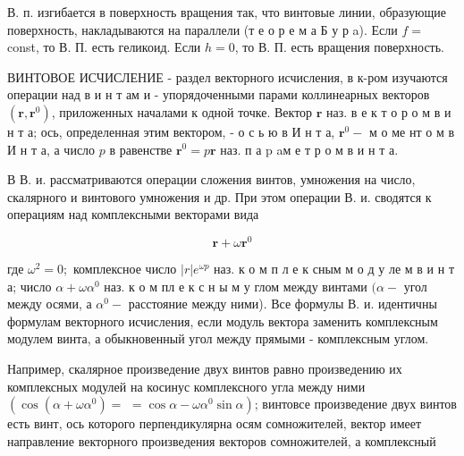 \documentclass[10pt]{article}
\begin{document}
В. п. изгибается в поверхность вращения так, что винтовые линии, образующие поверхность, накладываются на параллели (т е о р е м а Б у р a). Если $f=$ const, то В. П. есть геликоид. Если $h=0$, то В. П. есть вращения поверхность.



ВИНТОВОЕ ИСЧИСЛЕНИЕ - раздел векторного исчисления, в к-ром изучаются операции над в и н т ам и - упорядоченными парами коллинеарных векторов $\left(\boldsymbol{r}, \boldsymbol{r}^{0}\right)$, приложенных началами к одной точке. Вектор $\boldsymbol{r}$ наз. в е к т о р о м в и н т а; ось, определенная этим вектором, - о с ь ю в И н т а, $\boldsymbol{r}^{0}-$ м о ме нт о м в И н т а, а число $p$ в равенстве $\boldsymbol{r}^{0}=p \boldsymbol{r}$ наз. п а $\mathrm{p}$ aм е т р о м в и н т а.



В В. и. рассматриваются операции сложения винтов, умножения на число, скалярного и винтового умножения и др. При этом операции В. и. сводятся к операциям над комплексными векторами вида



\[

\boldsymbol{r}+\omega \boldsymbol{r}^{0}

\]



где $\omega^{2}=0 ;$ комплексное число $|r| e^{\omega p}$ наз. к о м п л е к сным м о д у ле м в и н т а; число $\alpha+\omega \alpha^{0}$ наз. к о м пл е к с н ы м у глом между винтами $(\alpha-$ угол между осями, а $\alpha^{0}-$ расстояние между ними). Все формулы В. и. идентичны формулам векторного исчисления, если модуль вектора заменить комплексным модулем винта, а обыкновенный угол между прямыми - комплексным углом.



Например, скалярное произведение двух винтов равно произведению их комплексных модулей на косинус комплексного угла между ними $\left(\cos \left(\alpha+\omega \alpha^{0}\right)=\right.$ $\left.=\cos \alpha-\omega \alpha^{0} \sin \alpha\right)$; винтовсе произведение двух винтов есть винт, ось которого перпендикулярна осям сомножителей, вектор имеет направление векторного произведения векторов сомножителей, а комплексный
\end{document}
